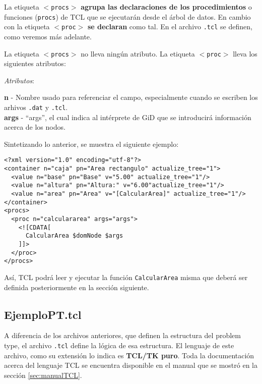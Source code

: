 \documentclass[10pt, a4paper, twocolumn]{article} %
\begin{document}
La etiqueta \texttt{$<$procs$>$} \textbf{agrupa las declaraciones de los procedimientos} o funciones (\texttt{procs}) de TCL que se ejecutarán desde el árbol de datos. En cambio con la etiqueta \texttt{$<$proc$>$} \textbf{se declaran} como tal. En el archivo \texttt{.tcl} se definen, como veremos más adelante.

La etiqueta \texttt{$<$procs$>$} no lleva ningún atributo. La etiqueta \texttt{$<$proc$>$} lleva los siguientes atributos:

\vspace{0.15cm}
\textit{Atributos}:

\vspace{0.15cm}
	\textbf{n} - Nombre usado para referenciar el campo, especialmente cuando se escriben los arhivos \texttt{.dat} y \texttt{.tcl}.\\
	\textbf{args} - ``args'', el cual indica al intérprete de GiD que se introducirá información acerca de los nodos.\\
\vspace{0.15cm}

Sintetizando lo anterior, se muestra el siguiente ejemplo:

\lstset{language=XML} 
\begin{lstlisting}
<?xml version="1.0" encoding="utf-8"?>
<container n="caja" pn="Area rectangulo" actualize_tree="1">
  <value n="base" pn="Base" v="5.00" actualize_tree="1"/>
  <value n="altura" pn="Altura:" v="6.00"actualize_tree="1"/>
  <value n="area" pn="Area" v="[CalcularArea]" actualize_tree="1"/>
</container>
<procs>
  <proc n="calculararea" args="args">
    <![CDATA[
      CalcularArea $domNode $args
    ]]>
  </proc>
</procs>
\end{lstlisting}

Así, TCL podrá leer y ejecutar la función \texttt{CalcularArea} misma que deberá ser definida posteriormente en la sección siguiente.


\subsection{EjemploPT.tcl}

A diferencia de los archivos anteriores, que definen la estructura del problem type, el archivo \texttt{.tcl} define la lógica de esa estructura. El lenguaje de este archivo, como su extensión lo indica es \textbf{TCL/TK puro}. Toda la documentación acerca del lenguaje TCL se encuentra disponible en el manual que se mostró en la sección \ref{sec:manualTCL}.
\end{document}
